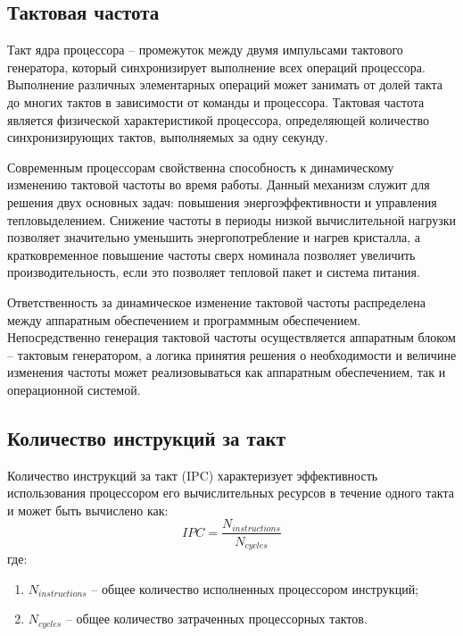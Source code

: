 \subsection{Тактовая частота}

Такт ядра процессора -- промежуток между двумя импульсами тактового генератора, который синхронизирует выполнение всех операций процессора. Выполнение различных элементарных операций может занимать от долей такта до многих тактов в зависимости от команды и процессора. Тактовая частота является физической характеристикой процессора, определяющей количество синхронизирующих тактов, выполняемых за одну секунду. 

Современным процессорам свойственна способность к динамическому изменению тактовой частоты во время работы. Данный механизм служит для решения двух основных задач: повышения энергоэффективности и управления тепловыделением. Снижение частоты в периоды низкой вычислительной нагрузки позволяет значительно уменьшить энергопотребление и нагрев кристалла, а кратковременное повышение частоты сверх номинала позволяет увеличить производительность, если это позволяет тепловой пакет и система питания.

Ответственность за динамическое изменение тактовой частоты распределена между аппаратным обеспечением и программным обеспечением. Непосредственно генерация тактовой частоты осуществляется аппаратным блоком -- тактовым генератором, а логика принятия решения о необходимости и величине изменения частоты может реализовываться как аппаратным обеспечением, так и операционной системой.

\subsection{Количество инструкций за такт}

Количество инструкций за такт (IPC) характеризует эффективность использования процессором его вычислительных ресурсов в течение одного такта и может быть вычислено как:
\begin{equation}
	IPC = \frac{N_{instructions}}{N_{cycles}}
\end{equation}
где:
\begin{enumerate}
	\item $N_{instructions}$ -- общее количество исполненных процессором инструкций;
	\item $N_{cycles}$ -- общее количество затраченных процессорных тактов.
\end{enumerate}

